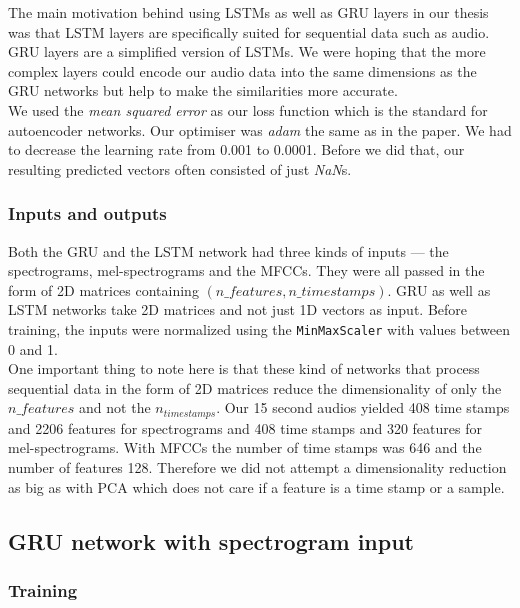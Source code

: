 The main motivation behind using LSTMs as well as GRU layers in our thesis was that LSTM layers are specifically suited for sequential data such as audio. GRU layers are a simplified version of LSTMs. We were hoping that the more complex layers could encode our audio data into the same dimensions as the GRU networks but help to make the similarities more accurate. \\

We used the \textit{mean squared error} as our loss function which is the standard for autoencoder networks. Our optimiser was \textit{adam} the same as in the \cite{inproceedings_RNNs} paper. We had to decrease the learning rate from 0.001 to 0.0001. Before we did that, our resulting predicted vectors often consisted of just \textit{NaN}s.

\subsubsection{Inputs and outputs}
Both the GRU and the LSTM network had three kinds of inputs --- the spectrograms, mel-spectrograms and the MFCCs. They were all passed in the form of 2D matrices containing $(n\_features, n\_timestamps)$. GRU as well as LSTM networks take 2D matrices and not just 1D vectors as input. Before training, the inputs were normalized using the \texttt{MinMaxScaler} with values between 0 and 1. \\
One important thing to note here is that these kind of networks that process sequential data in the form of 2D matrices reduce the dimensionality of only the $n\_features$ and not the $n_{timestamps}$. Our 15 second audios yielded 408 time stamps and 2206 features for spectrograms and 408 time stamps and 320 features for mel-spectrograms. With MFCCs the number of time stamps was 646 and the number of features 128. Therefore we did not attempt a dimensionality reduction as big as with PCA which does not care if a feature is a time stamp or a sample.

\subsection{GRU network with spectrogram input}

\subsubsection{Training}

